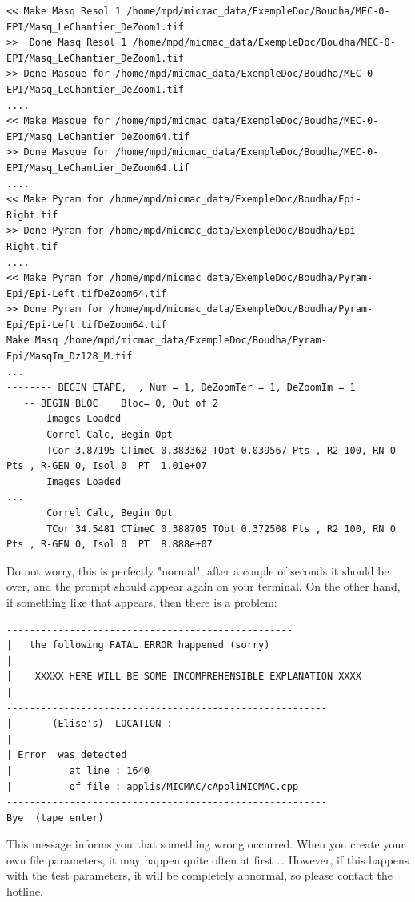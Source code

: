 {\scriptsize
\begin{verbatim}
<< Make Masq Resol 1 /home/mpd/micmac_data/ExempleDoc/Boudha/MEC-0-EPI/Masq_LeChantier_DeZoom1.tif
>>  Done Masq Resol 1 /home/mpd/micmac_data/ExempleDoc/Boudha/MEC-0-EPI/Masq_LeChantier_DeZoom1.tif
>> Done Masque for /home/mpd/micmac_data/ExempleDoc/Boudha/MEC-0-EPI/Masq_LeChantier_DeZoom1.tif
....
<< Make Masque for /home/mpd/micmac_data/ExempleDoc/Boudha/MEC-0-EPI/Masq_LeChantier_DeZoom64.tif
>> Done Masque for /home/mpd/micmac_data/ExempleDoc/Boudha/MEC-0-EPI/Masq_LeChantier_DeZoom64.tif
....
<< Make Pyram for /home/mpd/micmac_data/ExempleDoc/Boudha/Epi-Right.tif
>> Done Pyram for /home/mpd/micmac_data/ExempleDoc/Boudha/Epi-Right.tif
....
<< Make Pyram for /home/mpd/micmac_data/ExempleDoc/Boudha/Pyram-Epi/Epi-Left.tifDeZoom64.tif
>> Done Pyram for /home/mpd/micmac_data/ExempleDoc/Boudha/Pyram-Epi/Epi-Left.tifDeZoom64.tif
Make Masq /home/mpd/micmac_data/ExempleDoc/Boudha/Pyram-Epi/MasqIm_Dz128_M.tif
...
-------- BEGIN ETAPE,  , Num = 1, DeZoomTer = 1, DeZoomIm = 1
   -- BEGIN BLOC    Bloc= 0, Out of 2
       Images Loaded
       Correl Calc, Begin Opt
       TCor 3.87195 CTimeC 0.383362 TOpt 0.039567 Pts , R2 100, RN 0 Pts , R-GEN 0, Isol 0  PT  1.01e+07
       Images Loaded
...
       Correl Calc, Begin Opt
       TCor 34.5481 CTimeC 0.388705 TOpt 0.372508 Pts , R2 100, RN 0 Pts , R-GEN 0, Isol 0  PT  8.888e+07
\end{verbatim}
}

Do not worry, this is perfectly "normal", after a couple of seconds it should be over, and the
prompt should appear again on your terminal. On the other hand, if something like
that appears, then there is a problem:

{\scriptsize
\begin{verbatim}
--------------------------------------------------
|   the following FATAL ERROR happened (sorry)
|
|    XXXXX HERE WILL BE SOME INCOMPREHENSIBLE EXPLANATION XXXX
|
--------------------------------------------------------
|       (Elise's)  LOCATION :
|
| Error  was detected
|          at line : 1640
|          of file : applis/MICMAC/cAppliMICMAC.cpp
--------------------------------------------------------
Bye  (tape enter)
\end{verbatim}
}


This message informs you that something wrong occurred. When you
create your own file parameters, it may happen quite often at first \dots
However, if this happens with the test parameters,
it will be completely abnormal, so please contact the hotline.


